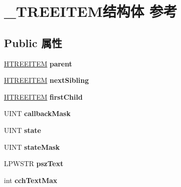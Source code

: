 \hypertarget{struct___t_r_e_e_i_t_e_m}{}\section{\+\_\+\+T\+R\+E\+E\+I\+T\+E\+M结构体 参考}
\label{struct___t_r_e_e_i_t_e_m}
\subsection*{Public 属性}
\begin{DoxyCompactItemize}
\item 
\mbox{\label{struct___t_r_e_e_i_t_e_m_a819d9e5f578dcf68d0c9537216558003}} 
\hyperlink{struct___t_r_e_e_i_t_e_m}{H\+T\+R\+E\+E\+I\+T\+EM} {\bfseries parent}
\item 
\mbox{\label{struct___t_r_e_e_i_t_e_m_aa86d07ed3438fd668daf5f4050df93c7}} 
\hyperlink{struct___t_r_e_e_i_t_e_m}{H\+T\+R\+E\+E\+I\+T\+EM} {\bfseries next\+Sibling}
\item 
\mbox{\label{struct___t_r_e_e_i_t_e_m_a7d002851f140340dcbea51114de849b9}} 
\hyperlink{struct___t_r_e_e_i_t_e_m}{H\+T\+R\+E\+E\+I\+T\+EM} {\bfseries first\+Child}
\item 
\mbox{\label{struct___t_r_e_e_i_t_e_m_a31f485d6e4db407b5e7591a6e27c0cd4}} 
U\+I\+NT {\bfseries callback\+Mask}
\item 
\mbox{\label{struct___t_r_e_e_i_t_e_m_a749fa4e296f4d7e4d456137de9bde8fb}} 
U\+I\+NT {\bfseries state}
\item 
\mbox{\label{struct___t_r_e_e_i_t_e_m_a6e0983ccda9d7ef6ad822dd5027f3e1a}} 
U\+I\+NT {\bfseries state\+Mask}
\item 
\mbox{\label{struct___t_r_e_e_i_t_e_m_a49084e475e1c52ef22c76cea77b21342}} 
L\+P\+W\+S\+TR {\bfseries psz\+Text}
\item 
\mbox{\label{struct___t_r_e_e_i_t_e_m_ac72bb3d83a93a48d42764b263f9f629a}} 
int {\bfseries cch\+Text\+Max}
\item 

\end{DoxyCompactItemize}
